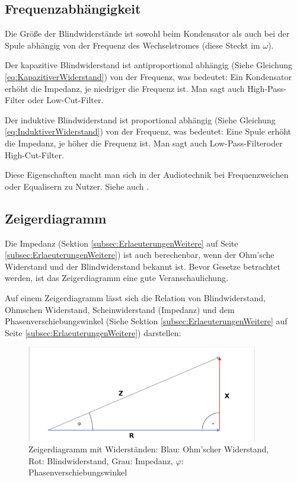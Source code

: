 \subsection{Frequenzabhängigkeit}	\label{subsec:Frequenzabhaengigkeit}

Die Größe der Blindwiderstände ist sowohl beim Kondensator als auch bei der Spule abhängig von der Frequenz des Wechselstromes (diese Steckt im $\omega$).

Der kapazitive Blindwiderstand ist antiproportional abhängig (Siehe Gleichung \ref{eq:KapazitiverWiderstand}) von der Frequenz, was bedeutet: \glqq Ein Kondensator erhöht die Impedanz, je niedriger die Frequenz ist.\grqq{} Man sagt auch \glqq High-Pass-Filter\grqq{} oder \glqq Low-Cut-Filter\grqq .

Der induktive Blindwiderstand ist proportional abhängig (Siehe Gleichung \ref{eq:InduktiverWiderstand}) von der Frequenz, was bedeutet: \glqq Eine Spule erhöht die Impedanz, je höher die Frequenz ist.\grqq{} Man sagt auch \glqq Low-Pass-Filter\grqq oder \glqq High-Cut-Filter\grqq .

Diese Eigenschaften macht man sich in der Audiotechnik bei Frequenzweichen oder Equalisern zu Nutzer. Siehe auch .



\subsection{Zeigerdiagramm}	\label{subsec:WiderstaendeZeigerdiagram}

Die Impedanz (Sektion \ref{subsec:ErlaeuterungenWeitere} auf Seite \ref{subsec:ErlaeuterungenWeitere}) ist auch berechenbar, wenn der Ohm'sche Widerstand und der Blindwiderstand bekannt ist. Bevor Gesetze betrachtet werden, ist das Zeigerdiagramm eine gute Veranschaulichung.

Auf einem Zeigerdiagramm lässt sich die Relation von Blindwiderstand, Ohmschen Widerstand, Scheinwiderstand (Impedanz) und dem Phasenverschiebungswinkel (Siehe Sektion \ref{subsec:ErlaeuterungenWeitere} auf Seite \ref{subsec:ErlaeuterungenWeitere}) darstellen:

\begin{figure}[h!]
	\centering
	\includegraphics[width=0.9\textwidth]{Pictures/Zeigerdiagramm}
	\caption{Zeigerdiagramm mit Widerständen: Blau: Ohm'scher Widerstand, Rot: Blindwiderstand, Grau: Impedanz, $\varphi$: Phasenverschiebungswinkel}
	\footnotemark
\end{figure}


